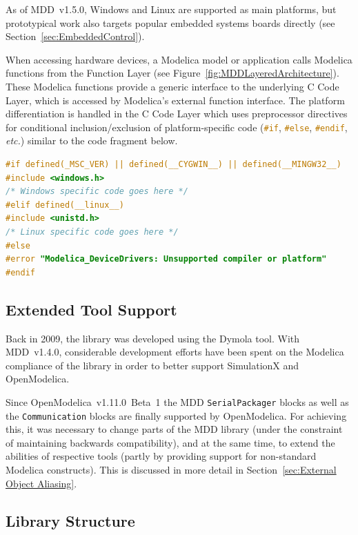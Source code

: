 \documentclass{resources/modelica}
\newcommand{\clang}[1]{\lstinline[language=c]|#1|}
\newcommand{\modelica}[1]{\lstinline[language=modelica]|#1|}
\begin{document}
As of MDD~v1.5.0, Windows and Linux are supported as main platforms,
but prototypical work also targets popular embedded systems boards directly (see
Section~\ref{sec:EmbeddedControl}).

When accessing hardware devices, a Modelica model or
application calls Modelica functions from the \textsf{Function Layer} (see
Figure~\ref{fig:MDDLayeredArchitecture}). These Modelica functions provide a
generic interface to the underlying \textsf{C Code Layer}, which is accessed by
Modelica's external function interface.
The platform differentiation is handled in the \textsf{C Code Layer} which
uses preprocessor directives for conditional inclusion/exclusion of
platform-specific code (\mbox{\clang{#if}}, \mbox{\clang{#else}},
\mbox{\clang{#endif}}, \textit{etc.}) similar to the code fragment below.
\begin{lstlisting}[language=C]
#if defined(_MSC_VER) || defined(__CYGWIN__) || defined(__MINGW32__)
#include <windows.h>
/* Windows specific code goes here */
#elif defined(__linux__)
#include <unistd.h>
/* Linux specific code goes here */
#else
#error "Modelica_DeviceDrivers: Unsupported compiler or platform"
#endif
\end{lstlisting}

\subsection{Extended Tool Support}
\label{sec:ExtendedToolSupport}

Back in 2009, the library was developed using the Dymola tool. With MDD~v1.4.0,
considerable development efforts have been spent on the Modelica compliance of
the library in order to better support SimulationX and OpenModelica.

Since OpenModelica~v1.11.0~Beta~1 the MDD \modelica{SerialPackager} blocks as well as the \modelica{Communication} blocks are finally
supported by OpenModelica. For achieving this, it was necessary to change parts
of the MDD library (under the constraint of maintaining backwards compatibility),
and at the same time, to extend the abilities of respective tools (partly by
providing support for non-standard Modelica constructs). This is discussed in more detail in
Section~\ref{sec:External Object Aliasing}.

\subsection{Library Structure}
\label{sec:LibraryStructure}
\end{document}
